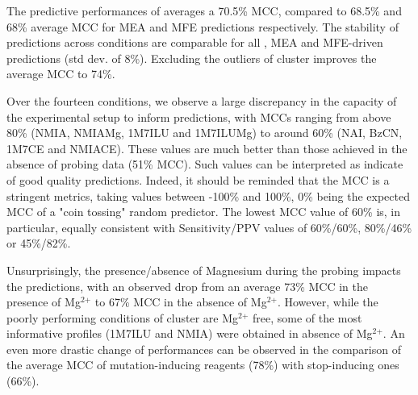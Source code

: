 \documentclass[a4,center,fleqn]{NAR}
\newcommand{\Software}[1]{\text{\ttfamily\bfseries #1}}
\newcommand{\OurTool}{\Software{IPANEMAP}\xspace}
\begin{document}
The predictive performances of \OurTool averages a 70.5\% MCC, compared to 68.5\% and 68\% average MCC for MEA and MFE predictions respectively. The stability of predictions across conditions are comparable for all \OurTool, MEA and MFE-driven predictions (std dev. of 8\%). Excluding the outliers of cluster  improves the average MCC to 74\%.

Over the fourteen conditions, we observe a large discrepancy in the capacity of the experimental setup to inform predictions, with MCCs ranging from above 80\% (NMIA, NMIAMg, 1M7ILU and 1M7ILUMg) to around 60\% (NAI, BzCN, 1M7CE and NMIACE). These values are much better than those achieved in the absence of probing data (51\% MCC). Such values can be interpreted as indicate of good quality predictions. Indeed, it should be reminded that the MCC is a stringent metrics, taking values between -100\% and 100\%, 0\% being the expected MCC of a "coin tossing" random predictor. The lowest MCC value of 60\% is, in particular, equally consistent with Sensitivity/PPV values of 60\%/60\%, 80\%/46\% or 45\%/82\%.

Unsurprisingly, the presence/absence of Magnesium during the probing impacts the predictions, with an observed drop from an average 73\% MCC in the presence of Mg$^\text{2+}$ to 67\% MCC in the absence of Mg$^\text{2+}$. However, while the poorly performing conditions of cluster  are Mg$^\text{2+}$ free, some of the most informative profiles (1M7ILU and NMIA) were obtained in absence of Mg$^\text{2+}$.
An even more drastic change of performances can be observed in the comparison of the average MCC of mutation-inducing reagents (78\%) with stop-inducing ones (66\%). 
\end{document}
